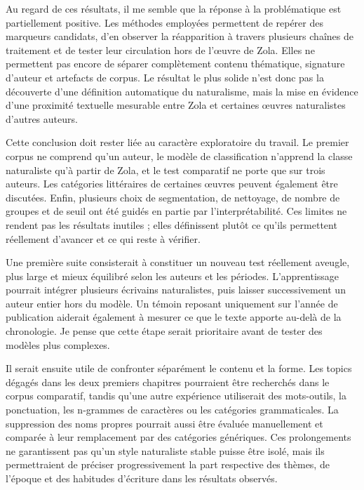 Au regard de ces résultats, il me semble que la réponse à la problématique est partiellement positive. Les méthodes employées permettent de repérer des marqueurs candidats, d'en observer la réapparition à travers plusieurs chaînes de traitement et de tester leur circulation hors de l'œuvre de Zola. Elles ne permettent pas encore de séparer complètement contenu thématique, signature d'auteur et artefacts de corpus. Le résultat le plus solide n'est donc pas la découverte d'une définition automatique du naturalisme, mais la mise en évidence d'une proximité textuelle mesurable entre Zola et certaines œuvres naturalistes d'autres auteurs.

Cette conclusion doit rester liée au caractère exploratoire du travail. Le premier corpus ne comprend qu'un auteur, le modèle de classification n'apprend la classe naturaliste qu'à partir de Zola, et le test comparatif ne porte que sur trois auteurs. Les catégories littéraires de certaines œuvres peuvent également être discutées. Enfin, plusieurs choix de segmentation, de nettoyage, de nombre de groupes et de seuil ont été guidés en partie par l'interprétabilité. Ces limites ne rendent pas les résultats inutiles ; elles définissent plutôt ce qu'ils permettent réellement d'avancer et ce qui reste à vérifier.

Une première suite consisterait à constituer un nouveau test réellement aveugle, plus large et mieux équilibré selon les auteurs et les périodes. L'apprentissage pourrait intégrer plusieurs écrivains naturalistes, puis laisser successivement un auteur entier hors du modèle. Un témoin reposant uniquement sur l'année de publication aiderait également à mesurer ce que le texte apporte au-delà de la chronologie. Je pense que cette étape serait prioritaire avant de tester des modèles plus complexes.

Il serait ensuite utile de confronter séparément le contenu et la forme. Les topics dégagés dans les deux premiers chapitres pourraient être recherchés dans le corpus comparatif, tandis qu'une autre expérience utiliserait des mots-outils, la ponctuation, les n-grammes de caractères ou les catégories grammaticales. La suppression des noms propres pourrait aussi être évaluée manuellement et comparée à leur remplacement par des catégories génériques. Ces prolongements ne garantissent pas qu'un style naturaliste stable puisse être isolé, mais ils permettraient de préciser progressivement la part respective des thèmes, de l'époque et des habitudes d'écriture dans les résultats observés.
